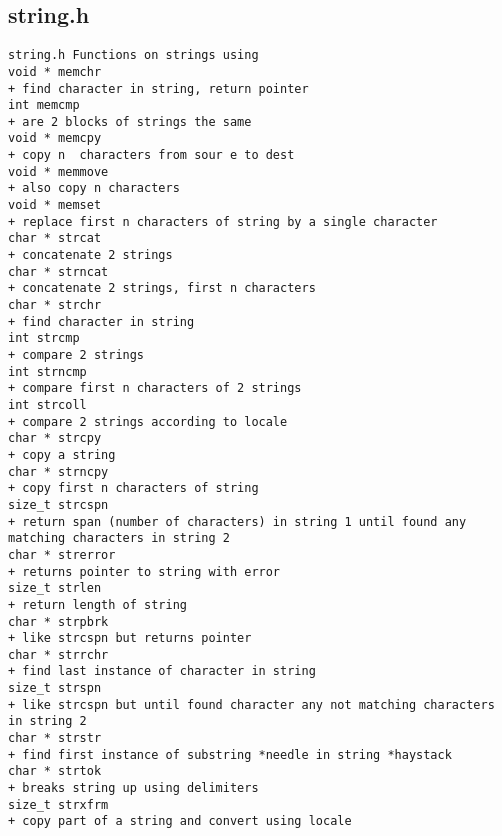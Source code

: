 
\subsection{string.h}
\begin{verbatim}
string.h Functions on strings using
void * memchr
+ find character in string, return pointer
int memcmp
+ are 2 blocks of strings the same
void * memcpy
+ copy n  characters from sour e to dest
void * memmove
+ also copy n characters
void * memset
+ replace first n characters of string by a single character
char * strcat
+ concatenate 2 strings
char * strncat
+ concatenate 2 strings, first n characters
char * strchr
+ find character in string
int strcmp
+ compare 2 strings
int strncmp
+ compare first n characters of 2 strings
int strcoll
+ compare 2 strings according to locale
char * strcpy
+ copy a string
char * strncpy
+ copy first n characters of string
size_t strcspn
+ return span (number of characters) in string 1 until found any matching characters in string 2
char * strerror
+ returns pointer to string with error
size_t strlen
+ return length of string
char * strpbrk
+ like strcspn but returns pointer
char * strrchr
+ find last instance of character in string
size_t strspn
+ like strcspn but until found character any not matching characters in string 2
char * strstr
+ find first instance of substring *needle in string *haystack
char * strtok
+ breaks string up using delimiters
size_t strxfrm
+ copy part of a string and convert using locale
\end{verbatim}

